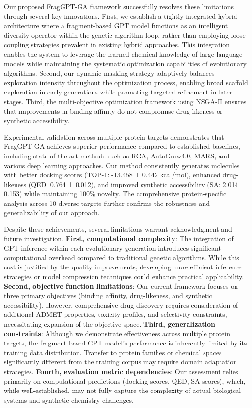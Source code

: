 \documentclass[lettersize,journal]{IEEEtran}
\begin{document}
Our proposed FragGPT-GA framework successfully resolves these limitations through several key innovations. First, we establish a tightly integrated hybrid architecture where a fragment-based GPT model functions as an intelligent diversity operator within the genetic algorithm loop, rather than employing loose coupling strategies prevalent in existing hybrid approaches. This integration enables the system to leverage the learned chemical knowledge of large language models while maintaining the systematic optimization capabilities of evolutionary algorithms. Second, our dynamic masking strategy adaptively balances exploration intensity throughout the optimization process, enabling broad scaffold exploration in early generations while promoting targeted refinement in later stages. Third, the multi-objective optimization framework using NSGA-II ensures that improvements in binding affinity do not compromise drug-likeness or synthetic accessibility.

Experimental validation across multiple protein targets demonstrates that FragGPT-GA achieves superior performance compared to established baselines, including state-of-the-art methods such as RGA, AutoGrow4.0, MARS, and various deep learning approaches. Our method consistently generates molecules with better docking scores (TOP-1: -13.458 ± 0.442 kcal/mol), enhanced drug-likeness (QED: 0.764 ± 0.012), and improved synthetic accessibility (SA: 2.014 ± 0.153) while maintaining 100\% novelty. The comprehensive protein-specific analysis across 10 diverse targets further confirms the robustness and generalizability of our approach.

Despite these achievements, several limitations warrant acknowledgment and future investigation. \textbf{First, computational complexity}: The integration of GPT inference within each evolutionary generation introduces significant computational overhead compared to traditional genetic algorithms. While this cost is justified by the quality improvements, developing more efficient inference strategies or model compression techniques could enhance practical applicability. \textbf{Second, objective function limitations}: Our current framework focuses on three primary objectives (binding affinity, drug-likeness, and synthetic accessibility). However, comprehensive drug discovery requires consideration of additional ADMET properties, toxicity profiles, and selectivity constraints, necessitating expansion of the objective space. \textbf{Third, generalization constraints}: Although we demonstrate effectiveness across multiple protein targets, the fragment-based GPT model's performance is inherently limited by its training data distribution. Transfer to protein families or chemical spaces significantly different from the training corpus may require domain adaptation strategies. \textbf{Fourth, evaluation metric dependencies}: Our assessment relies primarily on computational predictions (docking scores, QED, SA scores), which, while well-established, may not fully capture the complexity of actual biological systems and synthetic chemistry challenges.
\end{document}
